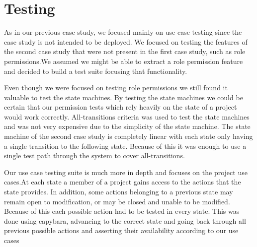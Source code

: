\documentclass[document.tex]{subfiles}
\begin{document}
\FloatBarrier

\section {Testing}

As in our previous case study, we focused mainly on use case testing since the case study is not intended to be deployed. We focused on testing the features of the second case study that were not present in the first case study, such as role permissions.We assumed we might be able to extract a role permission feature and decided to build a test suite focusing that functionality.

Even though we were focused on testing role permissions we still found it valuable to test the state machines. By testing the state machines we could be certain that our permission tests which rely heavily on the state of a project would work correctly. All-transitions criteria was used to test the state machines and was not very expensive due to the simplicity of the state machine. The state machine of the second case study is completely linear with each state only having a single transition to the following state. Because of this it was enough to use a single test path through the system to cover all-transitions.

Our use case testing suite is much more in depth and focuses on the project use cases.At each state a member of a project gains access to the actions that the state provides. In addition, some actions belonging to a previous state may remain open to modification, or may be closed and unable to be modified. Because of this each possible action had to be tested in every state. This was done using capybara, advancing to the correct state and going back through all previous possible actions and asserting their availability according to our use cases
\end{document}
